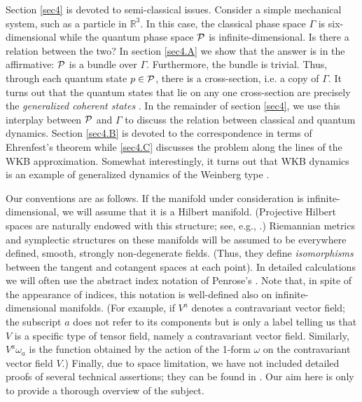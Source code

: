 \documentclass[12pt,aps,eqsecnum,tighten,nofootinbib]{revtex4-2}
\def\P{{\cal P}}
\def\R{\mathbb R}
\begin{document}
Section \ref{sec4} is devoted to semi-classical issues. Consider a
simple mechanical system, such as a particle in $\R^3$. In this case,
the classical phase space $\Gamma$ is six-dimensional while the
quantum phase space $\P$ is infinite-dimensional. Is there a relation
between the two? In section \ref{sec4.A} we show that the answer is in
the affirmative: $\P$ is a bundle over $\Gamma$. Furthermore, the
bundle is trivial. Thus, through each quantum state $p\in \P$, there
is a cross-section, i.e. a copy of $\Gamma$. It turns out that the
quantum states that lie on any one cross-section are precisely the
{\it generalized coherent states} \cite{perelomov,gilmore,klauder}. In
the remainder of section \ref{sec4}, we use this interplay between
$\P$ and $\Gamma$ to discuss the relation between classical and
quantum dynamics.  Section \ref{sec4.B} is devoted to the
correspondence in terms of Ehrenfest's theorem while \ref{sec4.C}
discusses the problem along the lines of the WKB
approximation. Somewhat interestingly, it turns out that WKB dynamics
is an example of generalized dynamics of the Weinberg type
\cite{weinberg}.

Our conventions are as follows. If the manifold under consideration is
infinite-dimensional, we will assume that it is a Hilbert
manifold. (Projective Hilbert spaces are naturally endowed with this
structure; see, e.g., \cite{thesis}.) Riemannian metrics and
symplectic structures on these manifolds will be assumed to be
everywhere defined, smooth, strongly non-degenerate fields. (Thus,
they define {\it isomorphisms} between the tangent and cotangent
spaces at each point). In detailed calculations we will often use the
abstract index notation of Penrose's \cite{rp2,indices}.  Note that,
in spite of the appearance of indices, this notation is well-defined
also on infinite-dimensional manifolds. (For example, if $V^a$ denotes
a contravariant vector field; the subscript $a$ does not refer to its
components but is only a label telling us that $V$ is a specific type
of tensor field, namely a contravariant vector field. Similarly,
$V^a\omega_a$ is the function obtained by the action of the 1-form
$\omega$ on the contravariant vector field $V$.)  Finally, due to
space limitation, we have not included detailed proofs of several
technical assertions; they can be found in \cite{thesis}. Our aim here
is only to provide a thorough overview of the subject.
\end{document}
